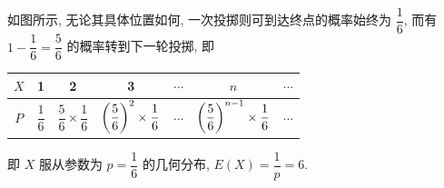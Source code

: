 \begin{example}
\begin{minipage}[t]{0.28\linewidth}
\begin{figure}[H]
        \end{figure}
    \end{minipage}
\end{example}
\begin{solution}
    如图所示, 无论其具体位置如何, 一次投掷则可到达终点的概率始终为 $\dfrac{1}{6}$, 而有 $1-\dfrac{1}{6}=\dfrac{5}{6}$ 的概率转到下一轮投掷, 即 
    \begin{table}[H]
        \centering
        \begin{tabular}{c|cccccc}
            $X$ & 1 & 2 & 3 & $\cdots$ & $n$ & $\cdots$\\ 
            \hline
            $P$ & $\dfrac{1}{6}$ & $\dfrac{5}{6}\times\dfrac{1}{6}$ & $\qty(\dfrac{5}{6})^2\times\dfrac{1}{6}$ & $\cdots$ & $\qty(\dfrac{5}{6})^{n-1}\times\dfrac{1}{6}$ & $\cdots$ 
        \end{tabular}
    \end{table}
    即 $X$ 服从参数为 $p=\dfrac{1}{6}$ 的几何分布, $E(X)=\dfrac{1}{p}=6.$
\end{solution}